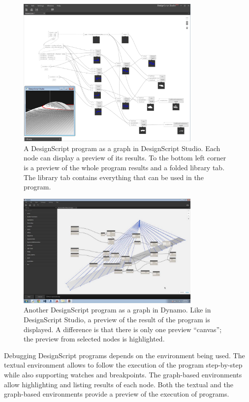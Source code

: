 \begin{figure}
	\centering
	\includegraphics[width=0.8\textwidth]{images/ds_dsstudio}
	\caption{A DesignScript program as a graph in DesignScript Studio. Each node can display a preview of its results. To the bottom left corner is a preview of the whole program results and a folded library tab. The library tab contains everything that can be used in the program.}
	\label{fig:ds:dsstudio}
\end{figure}

\begin{figure}
	\centering
	\includegraphics[width=0.8\textwidth]{images/ds_dynamo}
	\caption{Another DesignScript program as a graph in Dynamo. Like in DesignScript Studio, a preview of the result of the program is displayed. A difference is that there is only one preview ``canvas''; the preview from selected nodes is highlighted.}
	\label{fig:ds:dynamo}
\end{figure}

Debugging DesignScript programs depends on the environment being used.
The textual environment allows to follow the execution of the program step-by-step while also supporting watches and breakpoints.
The graph-based environments allow highlighting and listing results of each node.
Both the textual and the graph-based environments provide a preview of the execution of programs.

